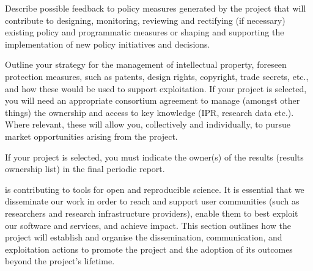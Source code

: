 \begin{draft}
Describe possible feedback to policy measures generated by the project that will
contribute to designing, monitoring, reviewing and rectifying (if necessary)
existing policy and programmatic measures or shaping and supporting the
implementation of new policy initiatives and decisions.
\begin{compactitem}
\item	Outline your strategy for the management of intellectual property, foreseen protection measures, such as patents, design rights, copyright, trade secrets, etc., and how these would be used to support exploitation.
	If your project is selected, you will need an appropriate consortium agreement
  to manage (amongst other things) the ownership and access to key knowledge
  (IPR, research data etc.). Where relevant, these will allow you, collectively
  and individually, to pursue market opportunities arising from the project.
\item If your project is selected, you must indicate the owner(s) of the results (results ownership list) in the final periodic report.
\end{compactitem}
\end{draft}


\TheProject is contributing to tools for open and reproducible science. It is
essential that we disseminate our work in order to reach and support user
communities (such as researchers and research infrastructure providers), enable
them to best exploit our software and services, and achieve impact.
This section outlines how the project will establish and organise the
dissemination, communication, and exploitation actions to promote the project
and the adoption of its outcomes beyond the project's lifetime.



